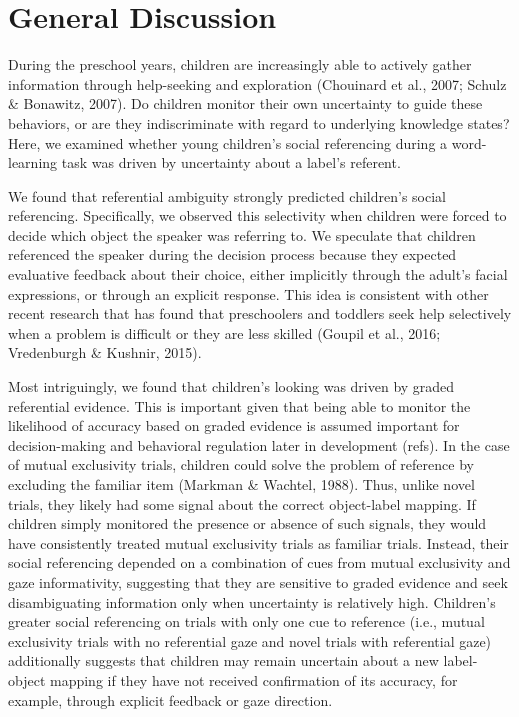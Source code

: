 \documentclass[a4paper,man,apacite,floatsintext]{apa6}
\begin{document}
\section{General Discussion}\label{general-discussion}

During the preschool years, children are increasingly able to actively
gather information through help-seeking and exploration (Chouinard et
al., 2007; Schulz \& Bonawitz, 2007). Do children monitor their own
uncertainty to guide these behaviors, or are they indiscriminate with
regard to underlying knowledge states? Here, we examined whether young
children's social referencing during a word-learning task was driven by
uncertainty about a label's referent.

We found that referential ambiguity strongly predicted children's social
referencing. Specifically, we observed this selectivity when children
were forced to decide which object the speaker was referring to. We
speculate that children referenced the speaker during the decision
process because they expected evaluative feedback about their choice,
either implicitly through the adult's facial expressions, or through an
explicit response. This idea is consistent with other recent research
that has found that preschoolers and toddlers seek help selectively when
a problem is difficult or they are less skilled (Goupil et al., 2016;
Vredenburgh \& Kushnir, 2015).

Most intriguingly, we found that children's looking was driven by graded
referential evidence. This is important given that being able to monitor
the likelihood of accuracy based on graded evidence is assumed important
for decision-making and behavioral regulation later in development
(refs). In the case of mutual exclusivity trials, children could solve
the problem of reference by excluding the familiar item (Markman \&
Wachtel, 1988). Thus, unlike novel trials, they likely had some signal
about the correct object-label mapping. If children simply monitored the
presence or absence of such signals, they would have consistently
treated mutual exclusivity trials as familiar trials. Instead, their
social referencing depended on a combination of cues from mutual
exclusivity and gaze informativity, suggesting that they are sensitive
to graded evidence and seek disambiguating information only when
uncertainty is relatively high. Children's greater social referencing on
trials with only one cue to reference (i.e., mutual exclusivity trials
with no referential gaze and novel trials with referential gaze)
additionally suggests that children may remain uncertain about a new
label-object mapping if they have not received confirmation of its
accuracy, for example, through explicit feedback or gaze direction.
\end{document}
